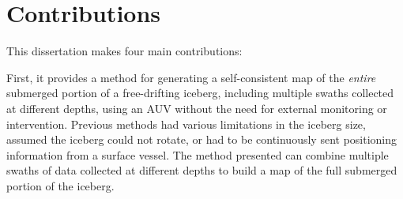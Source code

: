 %
%
%
%

\section{Contributions}

This dissertation makes four main contributions:

First, it provides a method for generating a self-consistent map of the \emph{entire} submerged portion of a free-drifting iceberg, including multiple swaths collected at different depths, using an AUV without the need for external monitoring or intervention. Previous methods had various limitations in the iceberg size, assumed the iceberg could not rotate, or had to be continuously sent positioning information from a surface vessel. The method presented can combine multiple swaths of data collected at different depths to build a map of the full submerged portion of the iceberg. 

